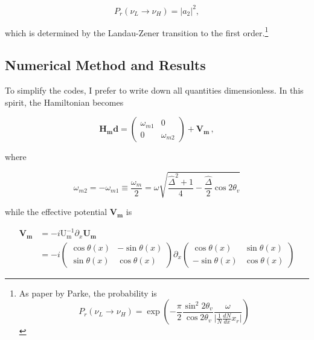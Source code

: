 \documentclass{tufte-handout}
\begin{document}
\begin{equation*}
P_r(\nu_L \to \nu_H) = \lvert a_2 \rvert^2,
\end{equation*}

which is determined by the Landau-Zener transition to the first order.\footnote{As paper by Parke, the probability is \begin{equation*}
P_r(\nu_L \to \nu_H) = \exp \left( -\frac{\pi}{2}\frac{\sin^2 2\theta_v}{\cos 2\theta_v} \frac{\omega}{\lvert \frac{1}{N} \frac{dN}{dx} x_r \rvert} \right)
\end{equation*}}








\subsection{Numerical Method and Results}




To simplify the codes, I prefer to write down all quantities dimensionless. In this spirit, the Hamiltonian becomes

\begin{equation*}
\mathbf{H_md} = \begin{pmatrix}
\omega_{m1} & 0 \\
0 & \omega_{m2}
\end{pmatrix} + \mathbf{V_m} \, ,
\end{equation*}

where 

\begin{equation*}
\omega_{m2} = - \omega_{m1} \equiv \frac{\omega_m}{2} = \omega \sqrt{\frac{\hat\Delta ^2 + 1}{4} - \frac{\hat\Delta}{2}\cos 2\theta_v }
\end{equation*}

while the effective potential $\mathbf{V_m}$ is

\begin{align*}
\mathbf{V_m} & = - i \mathrm{U_m^{-1}}\partial_x \mathbf{U_m} \\
& = - i \begin{pmatrix} \cos \theta(x) & -\sin\theta(x) \\ \sin\theta(x) & \cos\theta(x) \end{pmatrix} \partial_x \begin{pmatrix} \cos \theta(x) & \sin\theta(x) \\ -\sin\theta(x) & \cos\theta(x) \end{pmatrix} 
\end{align*}
\end{document}
